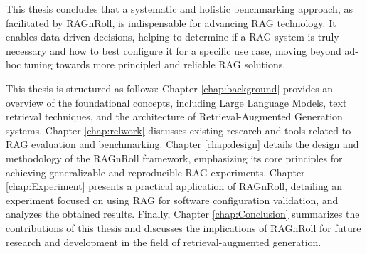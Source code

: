 This thesis concludes that a systematic and holistic benchmarking approach, as facilitated by RAGnRoll, is indispensable for advancing RAG technology. It enables data-driven decisions, helping to determine if a RAG system is truly necessary and how to best configure it for a specific use case, moving beyond ad-hoc tuning towards more principled and reliable RAG solutions.

This thesis is structured as follows:
Chapter \ref{chap:background} provides an overview of the foundational concepts, including Large Language Models, text retrieval techniques, and the architecture of Retrieval-Augmented Generation systems.
Chapter \ref{chap:relwork} discusses existing research and tools related to RAG evaluation and benchmarking.
Chapter \ref{chap:design} details the design and methodology of the RAGnRoll framework, emphasizing its core principles for achieving generalizable and reproducible RAG experiments.
Chapter \ref{chap:Experiment} presents a practical application of RAGnRoll, detailing an experiment focused on using RAG for software configuration validation, and analyzes the obtained results.
Finally, Chapter \ref{chap:Conclusion} summarizes the contributions of this thesis and discusses the implications of RAGnRoll for future research and development in the field of retrieval-augmented generation.
